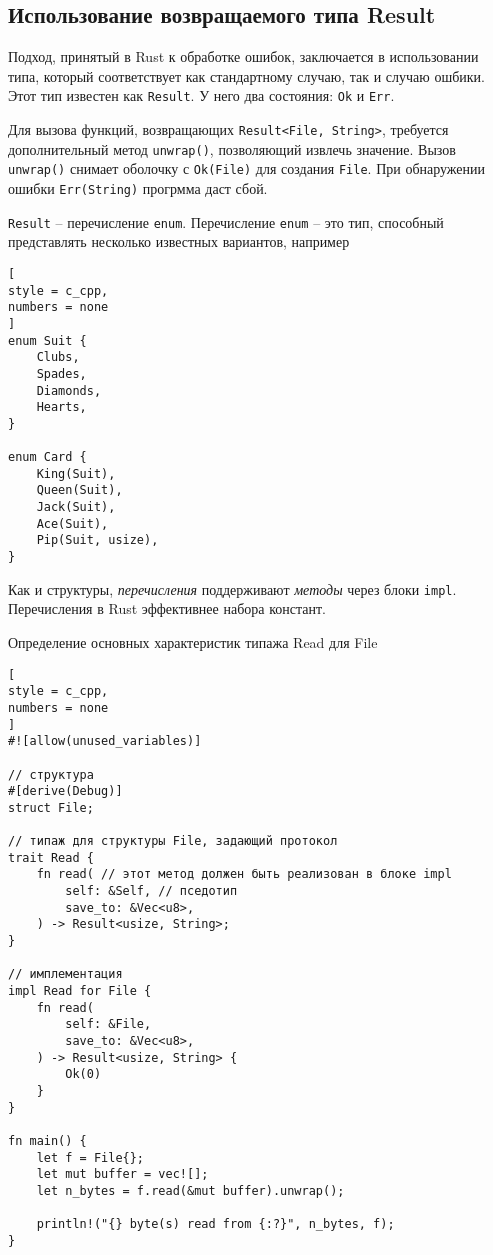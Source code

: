 \documentclass[%
	11pt,
	a4paper,
	utf8,
		]{article}
\begin{document}
\subsection{Использование возвращаемого типа Result}

Подход, принятый в Rust к обработке ошибок, заключается в использовании типа, который соответствует как стандартному случаю, так и случаю ошбики. Этот тип известен как \texttt{Result}. У него два состояния: \texttt{Ok} и \texttt{Err}.

Для вызова функций, возвращающих \texttt{Result<File, String>}, требуется дополнительный метод \verb|unwrap()|, позволяющий извлечь значение. Вызов \verb|unwrap()| снимает оболочку с \verb|Ok(File)| для создания \verb|File|. При обнаружении ошибки \verb|Err(String)| прогрмма даст сбой.

\texttt{Result} -- перечисление \texttt{enum}. Перечисление \texttt{enum} -- это тип, способный представлять несколько известных вариантов, например
\begin{lstlisting}[
style = c_cpp,
numbers = none
]
enum Suit {
    Clubs,
    Spades,
    Diamonds,
    Hearts,
}

enum Card {
    King(Suit),
    Queen(Suit),
    Jack(Suit),
    Ace(Suit),
    Pip(Suit, usize),
}
\end{lstlisting}

Как и структуры, \emph{перечисления} поддерживают \emph{методы} через блоки \texttt{impl}. Перечисления в Rust эффективнее набора констант.

Определение основных характеристик типажа Read для File
\begin{lstlisting}[
style = c_cpp,
numbers = none
]
#![allow(unused_variables)]

// структура 
#[derive(Debug)]
struct File;

// типаж для структуры File, задающий протокол
trait Read {
	fn read( // этот метод должен быть реализован в блоке impl
		self: &Self, // пседотип
		save_to: &Vec<u8>,
	) -> Result<usize, String>;
}

// имплементация
impl Read for File {
	fn read(
		self: &File,
		save_to: &Vec<u8>,
	) -> Result<usize, String> {
		Ok(0)
	}
}

fn main() {
	let f = File{};
	let mut buffer = vec![];
	let n_bytes = f.read(&mut buffer).unwrap();
	
	println!("{} byte(s) read from {:?}", n_bytes, f);
}
\end{lstlisting}
\end{document}
